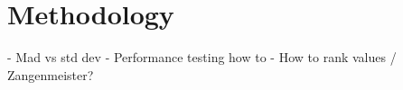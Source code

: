 
\chapter{Methodology}

- Mad vs std dev
- Performance testing how to
- How to rank values / Zangenmeister?
